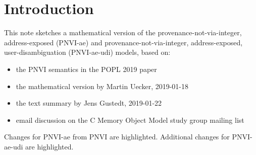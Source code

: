 \documentclass[acmsmall,review,screen]{acmart}\settopmatter{printfolios=true,printccs=false,printacmref=false}
\begin{document}




\maketitle



\newcommand{\myt}[1]{{\color{blue}#1}}
\newcommand{\myu}[1]{{\color{myudicolor}#1}}

\section{Introduction}

This note sketches a mathematical version of the
provenance-not-via-integer, address-exposed (PNVI-ae)
and provenance-not-via-integer, address-exposed, user-disambiguation (PNVI-ae-udi)
models, based on:
\begin{itemize}
\item the PNVI semantics in the POPL 2019 paper~\cite{cerberus-popl2019}
\item the mathematical version  by Martin Uecker, 2019-01-18
\item the text summary by Jens Gustedt, 2019-01-22
\item email discussion on the C Memory Object Model study group mailing list
\end{itemize}
Changes for PNVI-ae from PNVI are \myt{highlighted}.
Additional changes for PNVI-ae-udi are \myu{highlighted}. 
\end{document}
